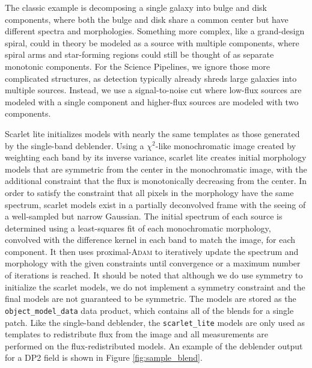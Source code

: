 The classic example is decomposing a single galaxy into bulge and disk components, where both the bulge and disk share a common center but have different spectra and morphologies.
Something more complex, like a grand-design spiral, could in theory be modeled as a source with multiple components, where spiral arms and star-forming regions could still be thought of as separate monotonic components.
For the Science Pipelines, we ignore those more complicated structures, as detection typically already shreds large galaxies into multiple sources.
Instead, we use a signal-to-noise cut where low-flux sources are modeled with a single component and higher-flux sources are modeled with two components.

Scarlet lite initializes models with nearly the same templates as those generated by the single-band deblender.
Using a $\chi^2$-like monochromatic image created by weighting each band by its inverse variance, scarlet lite creates initial morphology models that are symmetric from the center in the monochromatic image, with the additional constraint that the flux is monotonically decreasing from the center.
In order to satisfy the constraint that all pixels in the morphology have the same spectrum, scarlet models exist in a partially deconvolved frame with the seeing of a well-sampled but narrow Gaussian.
The initial spectrum of each source is determined using a least-squares fit of each monochromatic morphology, convolved with the difference kernel in each band to match the image, for each component.
It then uses proximal-\textsc{Adam} \citep[\textsc{PAdam};][]{2019arXiv191010094M} to iteratively update the spectrum and morphology with the given constraints until convergence or a maximum number of iterations is reached.
It should be noted that although we do use symmetry to initialize the scarlet models, we do not implement a symmetry constraint and the final models are not guaranteed to be symmetric.
The models are stored as the \texttt{object\_model\_data} data product, which contains all of the blends for a single patch.
Like the single-band deblender, the \texttt{scarlet\_lite} models are only used as templates to redistribute flux from the image and all measurements are performed on the flux-redistributed models.
An example of the deblender output for a DP2 field is shown in Figure \ref{fig:sample_blend}.

